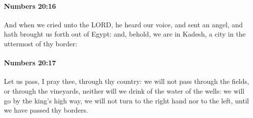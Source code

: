 		\paragraph{Numbers 20:16} %
			\label{NUMBERS-20-16}

			And when we cried unto the LORD, he heard our voice, and sent an angel, and hath brought us forth out of Egypt: and, behold, we are in Kadesh, a city in the uttermost of thy border:


		\paragraph{Numbers 20:17} %
			\label{NUMBERS-20-17}

			Let us pass, I pray thee, through thy country: we will not pass through the fields, or through the vineyards, neither will we drink of the water of the wells: we will go by the king’s high way, we will not turn to the right hand nor to the left, until we have passed thy borders.

